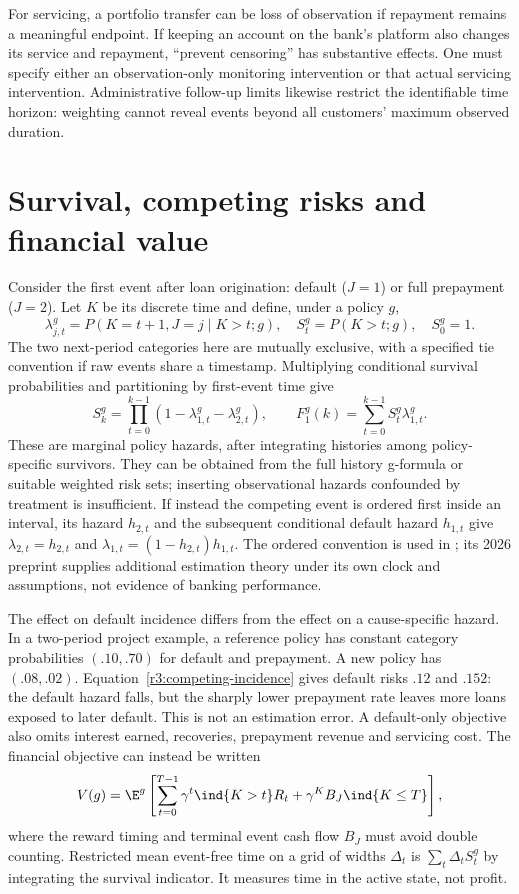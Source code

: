 For servicing, a portfolio transfer can be loss of observation if
repayment remains a meaningful endpoint. If keeping an account on the
bank's platform also changes its service and repayment, ``prevent
censoring'' has substantive effects. One must specify either an
observation-only monitoring intervention or that actual servicing
intervention. Administrative follow-up limits likewise restrict the
identifiable time horizon: weighting cannot reveal events beyond all
customers' maximum observed duration.

\section{Survival, competing risks and financial value}
\label{r3:competing-events}
Consider the first event after loan origination: default ($J=1$) or
full prepayment ($J=2$). Let $K$ be its discrete time and define,
under a policy $g$,
\[
 \lambda^g_{j,t}=P(K=t+1,J=j\mid K>t;g),\quad
 S_t^g=P(K>t;g),\quad S_0^g=1.
\]
The two next-period categories here are mutually exclusive, with a
specified tie convention if raw events share a timestamp. Multiplying
conditional survival probabilities and partitioning by first-event time
give
\begin{equation}
 S_k^g=\prod_{t=0}^{k-1}(1-\lambda^g_{1,t}-\lambda^g_{2,t}),\qquad
 F^g_1(k)=\sum_{t=0}^{k-1}S_t^g\lambda^g_{1,t}.
 \label{r3:competing-incidence}
\end{equation}
These are marginal policy hazards, after integrating histories among
policy-specific survivors. They can be obtained from the full
history g-formula or suitable weighted risk sets; inserting observational
hazards confounded by treatment is insufficient. If instead the
competing event is ordered first inside an interval, its hazard
$h_{2,t}$ and the subsequent conditional default hazard $h_{1,t}$
give $\lambda_{2,t}=h_{2,t}$ and
$\lambda_{1,t}=(1-h_{2,t})h_{1,t}$.
The ordered convention is used in
\citet[Section 2.2, equations (1)--(3)]{competing2026}; its 2026
preprint supplies additional estimation theory under its own clock
and assumptions, not evidence of banking performance.

The effect on default incidence differs from the effect on a
cause-specific hazard. In a two-period project example, a reference
policy has constant category probabilities $(.10,.70)$ for default
and prepayment. A new policy has $(.08,.02)$. Equation~\eqref{r3:competing-incidence}
gives default risks $.12$ and $.152$: the default hazard falls, but
the sharply lower prepayment rate leaves more loans exposed to later
default. This is not an estimation error. A default-only objective
also omits interest earned, recoveries, prepayment revenue and servicing
cost. The financial objective can instead be written
\[
 V(g)=\E^g\left[\sum_{t=0}^{T-1}\gamma^t\ind\{K>t\}R_t
                    +\gamma^K B_J\ind\{K\le T\}\right],
\]
where the reward timing and terminal event cash flow $B_J$ must avoid
double counting. Restricted mean event-free time on a grid of widths
$\Delta_t$ is $\sum_t\Delta_t S_t^g$ by integrating the survival
indicator. It measures time in the active state, not profit.

